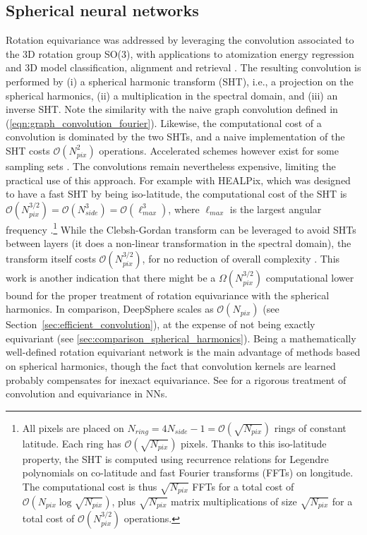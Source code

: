 \documentclass[final,twocolumn,3p,times,sort&compress]{elsarticle}
\newcommand{\secref}[1]{Section~\ref{sec:#1}}
\newcommand{\eqnref}[1]{(\ref{eqn:#1})}
\newcommand{\1}{\b{1}}              %
\newcommand{\0}{\b{0}}              %
\newcommand{\bO}{\mathcal{O}}
\begin{document}
\subsection{Spherical neural networks}

Rotation equivariance was addressed by leveraging the convolution associated to the 3D rotation group SO(3), with applications to atomization energy regression and 3D model classification, alignment and retrieval \citep{cohen2018sphericalcnn,esteves2017sphericalcnn}.
The resulting convolution is performed by (i) a spherical harmonic transform (SHT), i.e., a projection on the spherical harmonics, (ii) a  multiplication in the spectral domain, and (iii) an inverse SHT.
Note the similarity with the naive graph convolution defined in \eqnref{graph_convolution_fourier}.
Likewise, the computational cost of a convolution is dominated by the two SHTs, and a naive implementation of the SHT costs $\bO(N_{pix}^2)$ operations.
Accelerated schemes however exist for some sampling sets \citep[see][for examples]{mohlenkamp1999fast, rokhlin2006fast, reinecke2013libsharp}.
The convolutions remain nevertheless expensive, limiting the practical use of this approach.
For example with HEALPix, which was designed to have a fast SHT by being iso-latitude, the computational cost of the SHT is $\bO(N_{pix}^{3/2}) = \bO(N_{side}^3) = \bO(\ell_{max}^3)$, where $\ell_{max}$ is the largest angular frequency \citep{gorski2005healpix, reinecke2013libsharp}.\footnote{All pixels are placed on $N_{ring} = 4N_{side}-1 = \bO\left(\sqrt{N_{pix}}\right)$ rings of constant latitude.
Each ring has $\bO\left(\sqrt{N_{pix}}\right)$ pixels.
Thanks to this iso-latitude property, the SHT is computed using recurrence relations for Legendre polynomials on co-latitude and fast Fourier transforms (FFTs) on longitude.
The computational cost is thus $\sqrt{N_{pix}}$ FFTs for a total cost of $\bO\left( N_{pix} \log \sqrt{N_{pix}} \right)$, plus $\sqrt{N_{pix}}$ matrix multiplications of size $\sqrt{N_{pix}}$ for a total cost of $\bO\left(N_{pix}^{3/2}\right)$ operations.}
While the Clebsh-Gordan transform can be leveraged to avoid SHTs between layers (it does a non-linear transformation in the spectral domain), the transform itself costs $\bO(N_{pix}^{3/2})$, for no reduction of overall complexity \citep{kondor2018clebsch}.
This work is another indication that there might be a $\Omega(N_{pix}^{3/2})$ computational lower bound for the proper treatment of rotation equivariance with the spherical harmonics.
In comparison, DeepSphere scales as $\bO(N_{pix})$ (see \secref{efficient_convolution}), at the expense of not being exactly equivariant (see \ref{sec:comparison_spherical_harmonics}).
Being a mathematically well-defined rotation equivariant network is the main advantage of methods based on spherical harmonics, though the fact that convolution kernels are learned probably compensates for inexact equivariance.
See \citep{kondor2018equivariance} for a rigorous treatment of convolution and equivariance in NNs.
\end{document}
